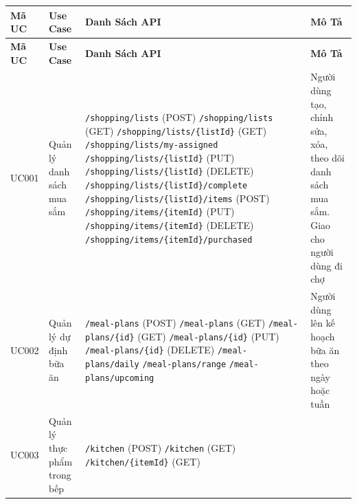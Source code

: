 \small
\begin{longtable}{|>{\centering\arraybackslash}p{1.5cm}|>{\raggedright\arraybackslash}p{2.5cm}|>{\raggedright\arraybackslash}p{7cm}|>{\raggedright\arraybackslash}p{3cm}|}
\hline
\textbf{Mã UC} & \textbf{Use Case} & \textbf{Danh Sách API} & \textbf{Mô Tả} \\
\hline
\endfirsthead
\hline
\textbf{Mã UC} & \textbf{Use Case} & \textbf{Danh Sách API} & \textbf{Mô Tả} \\
\hline
\endhead
UC001 & Quản lý danh sách mua sắm & 
\texttt{/shopping/lists} (POST) \newline
\texttt{/shopping/lists} (GET) \newline
\texttt{/shopping/lists/\{listId\}} (GET) \newline
\texttt{/shopping/lists/my-assigned} \newline
\texttt{/shopping/lists/\{listId\}} (PUT) \newline
\texttt{/shopping/lists/\{listId\}} (DELETE) \newline
\texttt{/shopping/lists/\{listId\}/complete} \newline
\texttt{/shopping/lists/\{listId\}/items} (POST) \newline
\texttt{/shopping/items/\{itemId\}} (PUT) \newline
\texttt{/shopping/items/\{itemId\}} (DELETE) \newline
\texttt{/shopping/items/\{itemId\}/purchased} & 
Người dùng tạo, chỉnh sửa, xóa, theo dõi danh sách mua sắm. Giao cho người dùng đi chợ \\
\hline
UC002 & Quản lý dự định bữa ăn & 
\texttt{/meal-plans} (POST) \newline
\texttt{/meal-plans} (GET) \newline
\texttt{/meal-plans/\{id\}} (GET) \newline
\texttt{/meal-plans/\{id\}} (PUT) \newline
\texttt{/meal-plans/\{id\}} (DELETE) \newline
\texttt{/meal-plans/daily} \newline
\texttt{/meal-plans/range} \newline
\texttt{/meal-plans/upcoming} & 
Người dùng lên kế hoạch bữa ăn theo ngày hoặc tuần \\
\hline
UC003 & Quản lý thực phẩm trong bếp & 
\texttt{/kitchen} (POST) \newline
\texttt{/kitchen} (GET) \newline
\texttt{/kitchen/\{itemId\}} (GET) \newline

\end{longtable}
